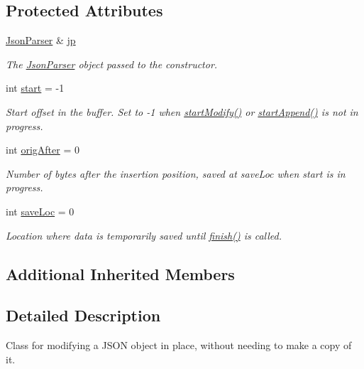 \subsection*{Protected Attributes}
\begin{DoxyCompactItemize}
\item 
\hyperlink{class_json_parser}{Json\+Parser} \& \hyperlink{class_json_modifier_ab78d43036cea562e37640ae12e20b706}{jp}
\begin{DoxyCompactList}\small\item\em The \hyperlink{class_json_parser}{Json\+Parser} object passed to the constructor. \end{DoxyCompactList}\item 
int \hyperlink{class_json_modifier_abd83b67763dc4ce55562bbdd5cea1e20}{start} = -\/1
\begin{DoxyCompactList}\small\item\em Start offset in the buffer. Set to -\/1 when \hyperlink{class_json_modifier_aa53d66feb3cd13165f3a2eac012a123b}{start\+Modify()} or \hyperlink{class_json_modifier_ab5bf356377a71120588413a4be998607}{start\+Append()} is not in progress. \end{DoxyCompactList}\item 
int \hyperlink{class_json_modifier_aec8c0683c15ad68dc1cb8180321bf902}{orig\+After} = 0
\begin{DoxyCompactList}\small\item\em Number of bytes after the insertion position, saved at save\+Loc when start is in progress. \end{DoxyCompactList}\item 
int \hyperlink{class_json_modifier_a7ea53418d660ce7cdec0964cca76015b}{save\+Loc} = 0
\begin{DoxyCompactList}\small\item\em Location where data is temporarily saved until \hyperlink{class_json_modifier_ae531232fa98f72eea8ea6ba07c065497}{finish()} is called. \end{DoxyCompactList}\end{DoxyCompactItemize}
\subsection*{Additional Inherited Members}


\subsection{Detailed Description}
Class for modifying a J\+S\+ON object in place, without needing to make a copy of it. 


